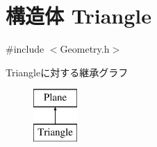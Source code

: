 \hypertarget{struct_triangle}{\section{構造体 Triangle}
\label{struct_triangle}
}


{\ttfamily \#include $<$Geometry.\-h$>$}

Triangleに対する継承グラフ\begin{figure}[H]
\begin{center}
\leavevmode
\includegraphics[height=2.000000cm]{d5/d4f/struct_triangle}
\end{center}
\end{figure}
